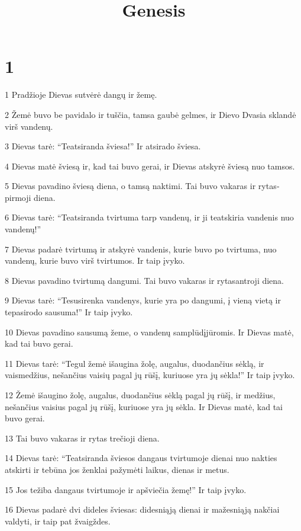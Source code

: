

\title{Genesis}


\chapter{1}


\par 1 Pradžioje Dievas sutvėrė dangų ir žemę. 
\par 2 Žemė buvo be pavidalo ir tuščia, tamsa gaubė gelmes, ir Dievo Dvasia sklandė virš vandenų. 
\par 3 Dievas tarė: “Teatsiranda šviesa!” Ir atsirado šviesa. 
\par 4 Dievas matė šviesą ir, kad tai buvo gerai, ir Dievas atskyrė šviesą nuo tamsos. 
\par 5 Dievas pavadino šviesą diena, o tamsą naktimi. Tai buvo vakaras ir rytas­ pirmoji diena. 
\par 6 Dievas tarė: “Teatsiranda tvirtuma tarp vandenų, ir ji teatskiria vandenis nuo vandenų!” 
\par 7 Dievas padarė tvirtumą ir atskyrė vandenis, kurie buvo po tvirtuma, nuo vandenų, kurie buvo virš tvirtumos. Ir taip įvyko. 
\par 8 Dievas pavadino tvirtumą dangumi. Tai buvo vakaras ir rytas­antroji diena. 
\par 9 Dievas tarė: “Tesusirenka vandenys, kurie yra po dangumi, į vieną vietą ir tepasirodo sausuma!” Ir taip įvyko. 
\par 10 Dievas pavadino sausumą žeme, o vandenų samplūdį­jūromis. Ir Dievas matė, kad tai buvo gerai. 
\par 11 Dievas tarė: “Tegul žemė išaugina žolę, augalus, duodančius sėklą, ir vaismedžius, nešančius vaisių pagal jų rūšį, kuriuose yra jų sėkla!” Ir taip įvyko. 
\par 12 Žemė išaugino žolę, augalus, duodančius sėklą pagal jų rūšį, ir medžius, nešančius vaisius pagal jų rūšį, kuriuose yra jų sėkla. Ir Dievas matė, kad tai buvo gerai. 
\par 13 Tai buvo vakaras ir rytas­ trečioji diena. 
\par 14 Dievas tarė: “Teatsiranda šviesos dangaus tvirtumoje dienai nuo nakties atskirti ir tebūna jos ženklai pažymėti laikus, dienas ir metus. 
\par 15 Jos težiba dangaus tvirtumoje ir apšviečia žemę!” Ir taip įvyko. 
\par 16 Dievas padarė dvi dideles šviesas: didesniąją­ dienai ir mažesniąją nakčiai valdyti, ir taip pat žvaigždes. 
